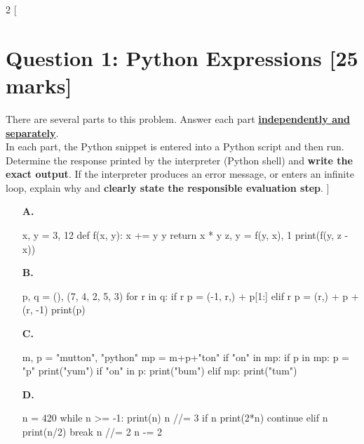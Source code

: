 \begin{multicols*}{2}
[
\section{Question 1: Python Expressions [25 marks]}
There are several parts to this problem. Answer each part \underline{\textbf{independently and separately}}. \\
In each part, the Python snippet is entered into a Python script and then run. Determine the
response printed by the interpreter (Python shell) and \textbf{write the exact output}. 
If the interpreter produces an error message, or enters an infinite loop, explain why and
\textbf{clearly state the responsible evaluation step}.
]
\begin{enumerate}
\item[\textbf{A.}] 
\begin{python}
x, y = 3, 12
def f(x, y):
    x += y
    y %
    return x * y
z, y = f(y, x), 1
print(f(y, z - x))
\end{python}
\begin{flushright}
    [5 marks]
\end{flushright}

\item[\textbf{B.}]
\begin{python}
p, q = (), (7, 4, 2, 5, 3)
for r in q:
    if r %
        p = (-1, r,) + p[1:]
    elif r %
        p = (r,) + p + (r, -1)
print(p)
\end{python}
\begin{flushright}
    [5 marks]
\end{flushright}

\item[\textbf{C.}]
\begin{python}
m, p = "mutton", "python"
mp = m+p+"ton"
if "on" in mp:
    if p in mp:
        p = "p"
        print("yum")
    if "on" in p:
        print("bum")
    elif mp:
        print("tum")
\end{python}
\begin{flushright}
    [5 marks]
\end{flushright}

\item[\textbf{D.}]
\begin{python}
n = 420
while n >= -1:
    print(n)
    n //= 3
    if n %
        print(2*n)
        continue
    elif n %
        print(n/2)
        break
    n //= 2
    n -= 2
\end{python}
\begin{flushright}
    [5 marks]
\end{flushright}


\end{enumerate}
\end{multicols*}
